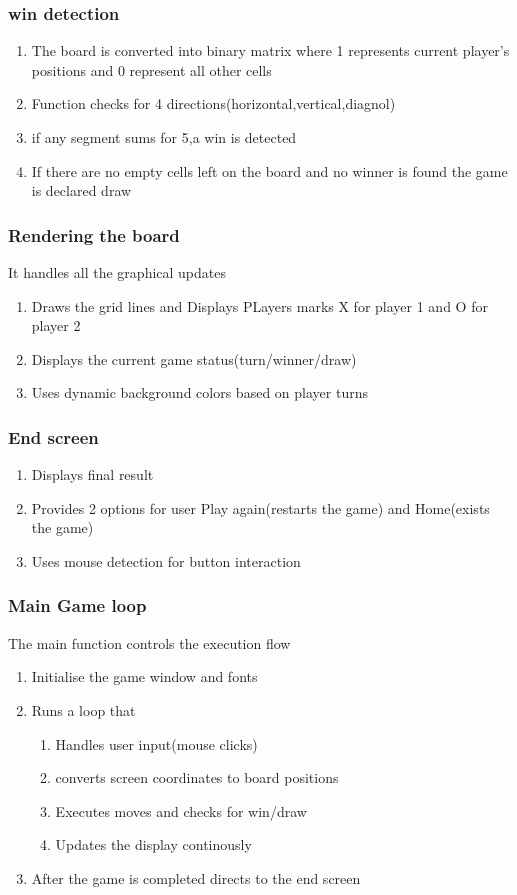 \documentclass{article}
\begin{document}
\subsubsection{win detection}
\begin{enumerate}
    \item The board is converted into binary matrix where 1 represents current player's positions and 0 represent all other cells
    \item Function checks for 4 directions(horizontal,vertical,diagnol)
    \item if any segment sums for 5,a win is detected
    \item If there are no empty cells left on the board and no winner is found the game is declared draw
\end{enumerate}
\subsubsection{Rendering the board}
It handles all the graphical updates
\begin{enumerate}
    \item Draws the grid lines and Displays PLayers marks X for player 1 and O for player 2
    \item Displays the current game status(turn/winner/draw)
    \item Uses dynamic background colors based on player turns 
\end{enumerate}
\subsubsection{End screen}
\begin{enumerate}
    \item Displays final result
    \item Provides 2 options for user Play again(restarts the game) and Home(exists the game)
    \item Uses mouse detection for button interaction
\end{enumerate}
\subsubsection{Main Game loop}
The main function controls the execution flow
\begin{enumerate}
    \item Initialise the game window and fonts
    \item Runs a loop that \begin{enumerate}
        \item Handles user input(mouse clicks)
        \item converts screen coordinates to board positions
        \item Executes moves and checks for win/draw
        \item Updates the display continously
    \end{enumerate}
    \item After the game is completed directs to the end screen
\end{enumerate}
\end{document}
